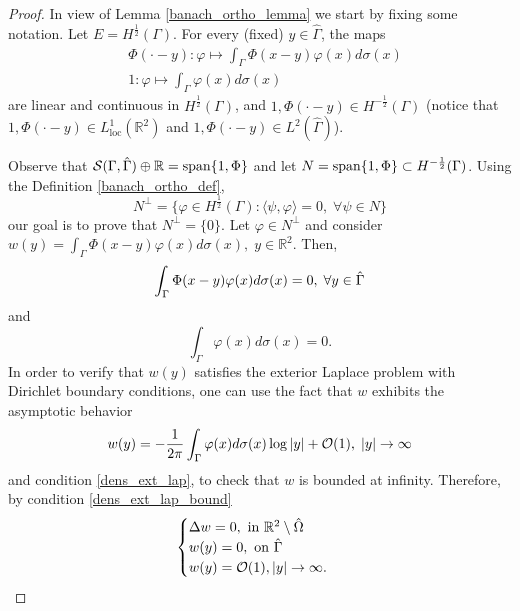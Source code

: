 \begin{proof}
    In view of Lemma \eqref{banach_ortho_lemma} we start by fixing some notation. Let \(E = H^\frac{1}{2}(\Gamma)\). For every (fixed) \(y \in \hat{\Gamma}\), the maps
    \begin{align*}
        &\Phi(\cdot-y): \varphi \mapsto \int_\Gamma \Phi(x-y)\varphi(x) d\sigma(x)\\
        &1: \varphi \mapsto \int_\Gamma \varphi (x) d\sigma(x)
    \end{align*}
    are linear and continuous in \(H^\frac{1}{2}(\Gamma)\), and \(1, \Phi(\cdot-y) \in H^{-\frac{1}{2}}(\Gamma)\) (notice that \(1, \Phi(\cdot-y) \in L^1_{\text{loc}}(\mathbb{R}^2)\) and \(1, \Phi(\cdot-y) \in L^2(\hat{\Gamma})\)).
    
    Observe that \(\mathcal{S}(\Gamma, \hat{\Gamma}) \oplus \mathbb{R} = \operatorname{span}\{1, \Phi\}\) and let \(N = \operatorname{span}\{1, \Phi\} \subset H^{-\frac{1}{2}}(\Gamma)\). Using the Definition \eqref{banach_ortho_def},
    \[
        N^\perp = \{\varphi \in H^{\frac{1}{2}}(\Gamma): \langle \psi, \varphi \rangle = 0, \; \forall \psi \in N\}
    \]
    our goal is to prove that \(N^\perp = \{0\}\). Let \(\varphi \in N^\perp\) and consider \(w(y) = \int_\Gamma\Phi(x-y)\varphi(x) d\sigma(x), \; y \in \mathbb{R}^2\). Then, 
    \begin{equation}\label{dens_ext_lap_bound}
        \int_\Gamma\Phi(x-y)\varphi(x) d\sigma(x) = 0, \; \forall y \in \hat{\Gamma}\\
    \end{equation}
    and
    \begin{equation}\label{dens_ext_lap}
        \int_\Gamma \varphi (x) d\sigma(x) = 0.
    \end{equation}
    In order to verify that \(w(y)\) satisfies the exterior Laplace problem with Dirichlet boundary conditions, one can use the fact that \(w\) exhibits the asymptotic behavior
    \[
        w(y) = -\frac{1}{2 \pi} \int_\Gamma \varphi (x) d\sigma(x) \log \abs{y} + \mathcal{O}(1), \; \abs{y} \rightarrow \infty
    \]
    and condition \eqref{dens_ext_lap}, to check that \(w\) is bounded at infinity. Therefore, by condition \eqref{dens_ext_lap_bound}
    \[
        \begin{cases}
            \Delta w = 0, \text{ in } \mathbb{R}^2\setminus \hat{\Omega}\\
            w(y) = 0, \text{ on } \hat{\Gamma}\\
            w(y) = \mathcal{O}(1), \abs{y} \rightarrow \infty.
        \end{cases}
\]
\end{proof}
